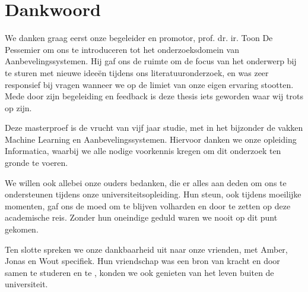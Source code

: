 \chapter{Dankwoord}

We danken graag eerst onze begeleider en promotor, prof. dr. ir. Toon De Pessemier om ons te introduceren tot het onderzoeksdomein van Aanbevelingssystemen. Hij gaf ons de ruimte om de focus van het onderwerp bij te sturen met nieuwe ideeën tijdens ons literatuuronderzoek, en was zeer responsief bij vragen wanneer we op de limiet van onze eigen ervaring stootten. Mede door zijn begeleiding en feedback is deze thesis iets geworden waar wij trots op zijn.

Deze masterproef is de vrucht van vijf jaar studie, met in het bijzonder de vakken Machine Learning en Aanbevelingssystemen. Hiervoor danken we onze opleiding Informatica, waarbij we alle nodige voorkennis kregen om dit onderzoek ten gronde te voeren.

We willen ook allebei onze ouders bedanken, die er alles aan deden om ons te ondersteunen tijdens onze universiteitsopleiding. Hun steun, ook tijdens moeilijke momenten, gaf ons de moed om te blijven volharden en door te zetten op deze academische reis. Zonder hun oneindige geduld waren we nooit op dit punt gekomen.

Ten slotte spreken we onze dankbaarheid uit naar onze vrienden, met Amber, Jonas en Wout specifiek. Hun vriendschap was een bron van kracht en door samen te studeren en te , konden we ook genieten van het leven buiten de universiteit.